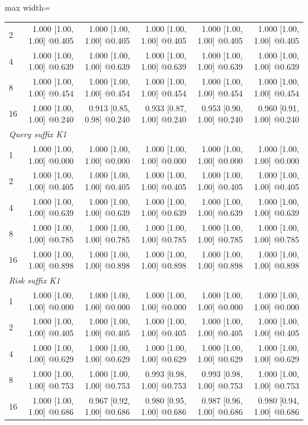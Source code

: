 \begin{table}[t]
\begin{adjustbox}{max width=\textwidth}
\begin{tabular}{lrrrrr}
2 & 1.000 [1.00, 1.00] @0.405 & 1.000 [1.00, 1.00] @0.405 & 1.000 [1.00, 1.00] @0.405 & 1.000 [1.00, 1.00] @0.405 & 1.000 [1.00, 1.00] @0.405 \\
4 & 1.000 [1.00, 1.00] @0.639 & 1.000 [1.00, 1.00] @0.639 & 1.000 [1.00, 1.00] @0.639 & 1.000 [1.00, 1.00] @0.639 & 1.000 [1.00, 1.00] @0.639 \\
8 & 1.000 [1.00, 1.00] @0.454 & 1.000 [1.00, 1.00] @0.454 & 1.000 [1.00, 1.00] @0.454 & 1.000 [1.00, 1.00] @0.454 & 1.000 [1.00, 1.00] @0.454 \\
16 & 1.000 [1.00, 1.00] @0.240 & 0.913 [0.85, 0.98] @0.240 & 0.933 [0.87, 1.00] @0.240 & 0.953 [0.90, 1.00] @0.240 & 0.960 [0.91, 1.00] @0.240 \\
\midrule
\multicolumn{6}{l}{\emph{Query suffix K1}} \\
1 & 1.000 [1.00, 1.00] @0.000 & 1.000 [1.00, 1.00] @0.000 & 1.000 [1.00, 1.00] @0.000 & 1.000 [1.00, 1.00] @0.000 & 1.000 [1.00, 1.00] @0.000 \\
2 & 1.000 [1.00, 1.00] @0.405 & 1.000 [1.00, 1.00] @0.405 & 1.000 [1.00, 1.00] @0.405 & 1.000 [1.00, 1.00] @0.405 & 1.000 [1.00, 1.00] @0.405 \\
4 & 1.000 [1.00, 1.00] @0.639 & 1.000 [1.00, 1.00] @0.639 & 1.000 [1.00, 1.00] @0.639 & 1.000 [1.00, 1.00] @0.639 & 1.000 [1.00, 1.00] @0.639 \\
8 & 1.000 [1.00, 1.00] @0.785 & 1.000 [1.00, 1.00] @0.785 & 1.000 [1.00, 1.00] @0.785 & 1.000 [1.00, 1.00] @0.785 & 1.000 [1.00, 1.00] @0.785 \\
16 & 1.000 [1.00, 1.00] @0.898 & 1.000 [1.00, 1.00] @0.898 & 1.000 [1.00, 1.00] @0.898 & 1.000 [1.00, 1.00] @0.898 & 1.000 [1.00, 1.00] @0.898 \\
\midrule
\multicolumn{6}{l}{\emph{Risk suffix K1}} \\
1 & 1.000 [1.00, 1.00] @0.000 & 1.000 [1.00, 1.00] @0.000 & 1.000 [1.00, 1.00] @0.000 & 1.000 [1.00, 1.00] @0.000 & 1.000 [1.00, 1.00] @0.000 \\
2 & 1.000 [1.00, 1.00] @0.405 & 1.000 [1.00, 1.00] @0.405 & 1.000 [1.00, 1.00] @0.405 & 1.000 [1.00, 1.00] @0.405 & 1.000 [1.00, 1.00] @0.405 \\
4 & 1.000 [1.00, 1.00] @0.629 & 1.000 [1.00, 1.00] @0.629 & 1.000 [1.00, 1.00] @0.629 & 1.000 [1.00, 1.00] @0.629 & 1.000 [1.00, 1.00] @0.629 \\
8 & 1.000 [1.00, 1.00] @0.753 & 1.000 [1.00, 1.00] @0.753 & 0.993 [0.98, 1.00] @0.753 & 0.993 [0.98, 1.00] @0.753 & 1.000 [1.00, 1.00] @0.753 \\
16 & 1.000 [1.00, 1.00] @0.686 & 0.967 [0.92, 1.00] @0.686 & 0.980 [0.95, 1.00] @0.686 & 0.987 [0.96, 1.00] @0.686 & 0.980 [0.94, 1.00] @0.686 \\

\end{tabular}
\end{adjustbox}
\end{table}
